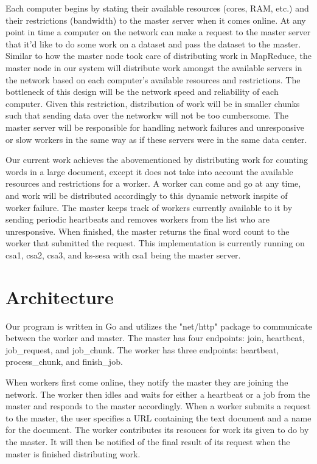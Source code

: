 \documentclass[twoside]{article}
\begin{document}
Each computer begins by stating their available resources (cores, RAM, etc.) and their restrictions (bandwidth) to the master server when it comes online. At any point in time a computer on the network can make a request to the master server that it'd like to do some work on a dataset and pass the dataset to the master. Similar to how the master node took care of distributing work in MapReduce, the master node in our system will distribute work amongst the available servers in the network based
on each computer's available resources and restrictions. The bottleneck of this design will be the network speed and reliability of each computer. Given this restriction, distribution of work will be in smaller chunks such that sending data over the networkw will not be too cumbersome. The master server will be responsible for handling network failures and unresponsive or slow workers in the same way as if these servers were in the same data center. 

Our current work achieves the abovementioned by distributing work for counting words in a large document, except it does not take into account the available resources and restrictions for a worker. A worker can come and go at any time, and work will be distributed accordingly to this dynamic network inspite of worker failure. The master keeps track of workers currently available to it by sending periodic heartbeats and removes workers from the list who are unresponsive. When
finished, the master returns the final word count to the worker that submitted the request. This implementation is currently running on csa1, csa2, csa3, and ks-sesa with csa1 being the master server. 
\section{Architecture}
Our program is written in Go and utilizes the "net/http" package to communicate between the worker and master. The master has four endpoints: join, heartbeat, job\_request, and job\_chunk. The worker has three endpoints: heartbeat, process\_chunk, and finish\_job. 

When workers first come online, they notify the master they are joining the network. The worker then idles and waits for either a heartbeat or a job from the master and responds to the master accordingly. When a worker submits a request to the master, the user specifies a URL containing the text document and a name for the document. The worker contributes its resouces for work its given to do by the master. It will then be notified of the final result of its request when the master is finished distributing work. 
\end{document}
